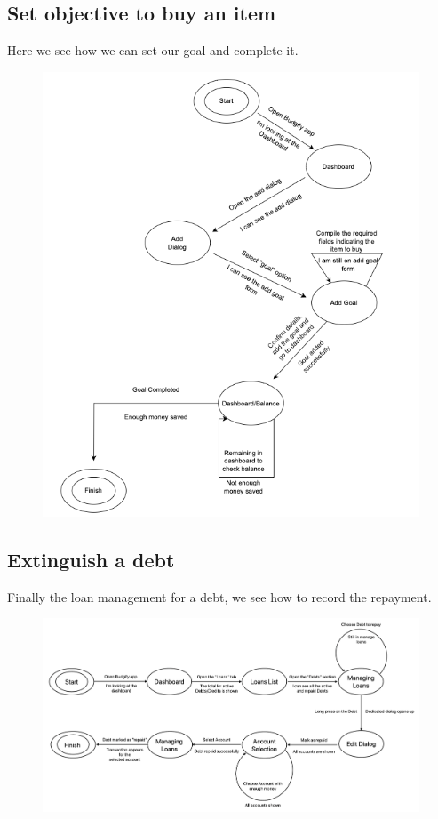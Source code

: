 \documentclass[a4paper,12pt]{article}
\begin{document}
\subsection{Set objective to buy an item}
Here we see how we can set our goal and complete it.
\begin{figure}[H]
    \centering
    \includegraphics[scale=0.7]{STN2.png}
\end{figure}
\vspace{5cm}
\subsection{Extinguish a debt}
Finally the loan management for a debt, we see how to record the repayment.
\begin{figure}[H]
    \centering
    \includegraphics[width=\linewidth]{STN3.png}
\end{figure}
\end{document}
